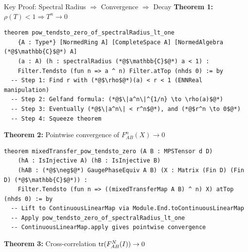 \documentclass[aspectratio=169,10pt]{beamer}
\begin{document}
\begin{frame}[fragile]{Key Proof: Spectral Radius $\Rightarrow$ Convergence $\Rightarrow$ Decay}
\vspace{-0.5em}
\textbf{Theorem 1:} $\rho(T) < 1 \Rightarrow T^n \to 0$ 
\begin{lstlisting}[basicstyle=\ttfamily\fontsize{5}{6.5}\selectfont\color{white}]
theorem pow_tendsto_zero_of_spectralRadius_lt_one
    {A : Type*} [NormedRing A] [CompleteSpace A] [NormedAlgebra (*@$\mathbb{C}$@*) A]
    (a : A) (h : spectralRadius (*@$\mathbb{C}$@*) a < 1) :
    Filter.Tendsto (fun n => a ^ n) Filter.atTop (nhds 0) := by
  -- Step 1: Find r with (*@$\rho$@*)(a) < r < 1 (ENNReal manipulation)
  -- Step 2: Gelfand formula: (*@$\|a^n\|^{1/n} \to \rho(a)$@*)
  -- Step 3: Eventually (*@$\|a^n\| < r^n$@*), and (*@$r^n \to 0$@*)
  -- Step 4: Squeeze theorem
\end{lstlisting}

\vspace{0.2em}
\textbf{Theorem 2:} Pointwise convergence of $F_{AB}^n(X) \to 0$
\begin{lstlisting}[basicstyle=\ttfamily\fontsize{5}{6.5}\selectfont\color{white}]
theorem mixedTransfer_pow_tendsto_zero (A B : MPSTensor d D)
    (hA : IsInjective A) (hB : IsInjective B)
    (hAB : (*@$\neg$@*) GaugePhaseEquiv A B) (X : Matrix (Fin D) (Fin D) (*@$\mathbb{C}$@*)) :
    Filter.Tendsto (fun n => ((mixedTransferMap A B) ^ n) X) atTop (nhds 0) := by
  -- Lift to ContinuousLinearMap via Module.End.toContinuousLinearMap
  -- Apply pow_tendsto_zero_of_spectralRadius_lt_one
  -- ContinuousLinearMap.apply gives pointwise convergence
\end{lstlisting}

\vspace{0.2em}
\textbf{Theorem 3:} Cross-correlation $\mathrm{tr}(F_{AB}^N(I)) \to 0$ 
\end{frame}
\end{document}
